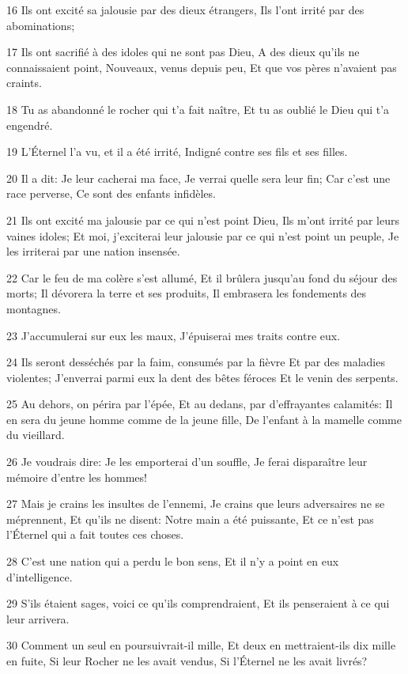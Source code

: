\par 16 Ils ont excité sa jalousie par des dieux étrangers, Ils l'ont irrité par des abominations;
\par 17 Ils ont sacrifié à des idoles qui ne sont pas Dieu, A des dieux qu'ils ne connaissaient point, Nouveaux, venus depuis peu, Et que vos pères n'avaient pas craints.
\par 18 Tu as abandonné le rocher qui t'a fait naître, Et tu as oublié le Dieu qui t'a engendré.
\par 19 L'Éternel l'a vu, et il a été irrité, Indigné contre ses fils et ses filles.
\par 20 Il a dit: Je leur cacherai ma face, Je verrai quelle sera leur fin; Car c'est une race perverse, Ce sont des enfants infidèles.
\par 21 Ils ont excité ma jalousie par ce qui n'est point Dieu, Ils m'ont irrité par leurs vaines idoles; Et moi, j'exciterai leur jalousie par ce qui n'est point un peuple, Je les irriterai par une nation insensée.
\par 22 Car le feu de ma colère s'est allumé, Et il brûlera jusqu'au fond du séjour des morts; Il dévorera la terre et ses produits, Il embrasera les fondements des montagnes.
\par 23 J'accumulerai sur eux les maux, J'épuiserai mes traits contre eux.
\par 24 Ils seront desséchés par la faim, consumés par la fièvre Et par des maladies violentes; J'enverrai parmi eux la dent des bêtes féroces Et le venin des serpents.
\par 25 Au dehors, on périra par l'épée, Et au dedans, par d'effrayantes calamités: Il en sera du jeune homme comme de la jeune fille, De l'enfant à la mamelle comme du vieillard.
\par 26 Je voudrais dire: Je les emporterai d'un souffle, Je ferai disparaître leur mémoire d'entre les hommes!
\par 27 Mais je crains les insultes de l'ennemi, Je crains que leurs adversaires ne se méprennent, Et qu'ils ne disent: Notre main a été puissante, Et ce n'est pas l'Éternel qui a fait toutes ces choses.
\par 28 C'est une nation qui a perdu le bon sens, Et il n'y a point en eux d'intelligence.
\par 29 S'ils étaient sages, voici ce qu'ils comprendraient, Et ils penseraient à ce qui leur arrivera.
\par 30 Comment un seul en poursuivrait-il mille, Et deux en mettraient-ils dix mille en fuite, Si leur Rocher ne les avait vendus, Si l'Éternel ne les avait livrés?
